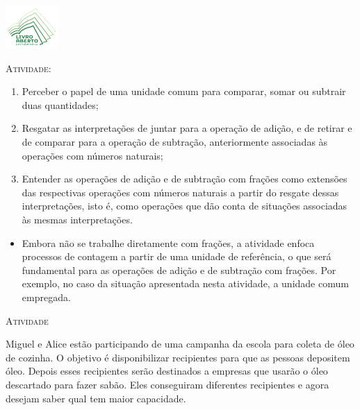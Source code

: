 \documentclass[10 pt,usenames,dvipsnames, oneside]{article}
\begin{document}
\begin{center}
  \begin{minipage}[l]{3cm}
\includegraphics[width=2cm]{../../../Figuras/logo}       
\end{minipage}\hfill
\begin{minipage}[r]{.8\textwidth}
 {\Large \scshape Atividade: }  
\end{minipage}
\end{center}
\vspace{.2cm}

\ifdefined\prof
\begin{goals}
\begin{enumerate}
\item     Perceber o papel de uma unidade comum para comparar, somar ou subtrair duas quantidades;
  \item     Resgatar as interpretações de juntar para a operação de adição, e de retirar e de comparar para a operação de subtração, anteriormente associadas às operações com números naturais;
  \item     Entender as operações de adição e de subtração com frações como extensões das respectivas operações com números naturais a partir do resgate dessas interpretações, isto é, como operações que dão conta de situações associadas às mesmas interpretações.
\end{enumerate}

\tcblower

\begin{itemize}
  \item     Embora não se trabalhe diretamente com frações, a atividade enfoca processos de contagem a partir de uma unidade de referência, o que será fundamental para as operações de adição e de subtração com frações. Por exemplo, no caso da situação apresentada nesta atividade, a unidade comum empregada.
\end{itemize}
\end{goals}

\bigskip
\begin{center}
{\large \scshape Atividade}
\end{center}
\fi

Miguel e Alice estão participando de uma campanha da escola para coleta de óleo de cozinha. O objetivo é disponibilizar recipientes para que as pessoas depositem óleo. Depois esses recipientes serão destinados a empresas que usarão o óleo descartado para fazer sabão. Eles conseguiram diferentes recipientes e agora desejam saber qual tem maior capacidade.
\end{document}
